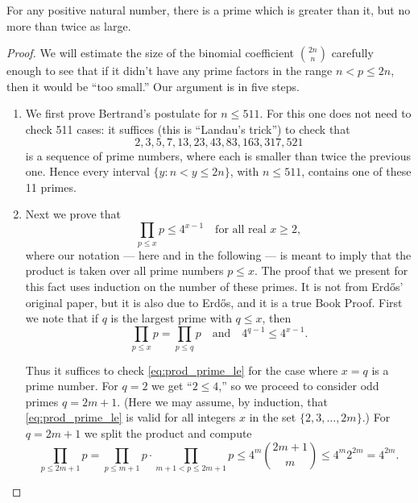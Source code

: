 \begin{theorem}
    \label{thm:bertrands_postulate}
    \leanok
    For any positive natural number, there is a prime which is greater than
    it, but no more than twice as large.
\end{theorem}
\begin{proof}
    \leanok
        We will estimate the size of the binomial coefficient $\binom{2n}{n}$ carefully enough to see that if it didn't have any prime factors in the range \(n < p \le 2n\), then it would be ``too small.'' Our argument is in five steps.

    \begin{enumerate}
        \item We first prove Bertrand's postulate for $n \le 511$. For this one does not need to check 511 cases: it suffices (this is ``Landau's trick'') to check that
        \[
        2,3,5,7,13,23,43,83,163,317,521
        \]
        is a sequence of prime numbers, where each is smaller than twice the previous one. Hence every interval \(\{y : n < y \le 2n\}\), with $n \le 511$, contains one of these 11 primes.
        
        \item Next we prove that
        \begin{equation} \label{eq:prod_prime_le}
            \prod_{p \le x} p \le 4^{x-1} \quad \text{for all real } x \ge 2,
        \end{equation}
        where our notation --- here and in the following --- is meant to imply that the product is taken over all prime numbers $p \le x$. The proof that we present for this fact uses induction on the number of these primes. It is not from Erdős' original paper, but it is also due to Erdős, and it is a true Book Proof. First we note that if \(q\) is the largest prime with \(q \le x\), then
        \[
        \prod_{p \le x} p = \prod_{p \le q} p \quad \text{and} \quad 4^{q-1} \le 4^{x-1}.
        \]

        Thus it suffices to check \eqref{eq:prod_prime_le} for the case where $x=q$ is a prime number. For $q=2$ we get ``$2 \le 4$,'' so we proceed to consider odd primes $q = 2m + 1$. (Here we may assume, by induction, that \eqref{eq:prod_prime_le} is valid for all integers $x$ in the set $\{2, 3, \dots, 2m\}$.) For $q = 2m + 1$ we split the product and compute
        \[
        \prod_{p \le 2m + 1} p = \prod_{p \le m + 1} p \cdot \prod_{m + 1 < p \le 2m + 1} p \le 4^m \binom{2m + 1}{m} \le 4^m 2^{2m} = 4^{2m}.
        \]


\end{enumerate}
\end{proof}
